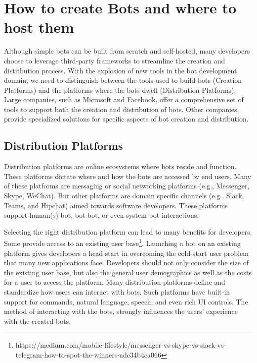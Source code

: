 \documentclass{sig-alternate}
\begin{document}
\section{How to create Bots and where to host them}

	Although simple bots can be built from scratch and self-hosted, many developers choose to leverage third-party frameworks to streamline the creation and distribution process. With the explosion of new tools in the bot development domain, we need to distinguish between the tools used to build bots (Creation Platforms) and the platforms where the bots dwell (Distribution Platforms).
%
	Large companies, such as Microsoft and Facebook, offer a comprehensive set of tools to support both the creation and distribution of bots. Other companies, provide specialized solutions for specific aspects of bot creation and distribution. 

	\subsection{Distribution Platforms}
	Distribution platforms are online ecosystems where bots reside and function. These platforms dictate where and how the bots are accessed by end users. Many of these platforms are messaging or social networking platforms (e.g., Messenger, Skype, WeChat).  But other platforms are domain specific channels (e.g., Slack, Teams, and Hipchat) aimed towards software developers.  
	These platforms support human(s)-bot, bot-bot, or even system-bot interactions.  

	Selecting the right distribution platform can lead to many benefits for developers.
	Some provide access to an existing user base\footnote{https://medium.com/mobile-lifestyle/messenger-vs-skype-vs-slack-vs-telegram-how-to-spot-the-winners-adc34b4ca066\label{How_to_spot_the_winners}}.
	Launching a bot on an existing platform gives developers a head start in overcoming the cold-start user problem that many new applications face. 
	Developers should not only consider the size of the existing user base, but also the general user demographics as well as the costs for a user to access the platform.   
	Many distribution platforms define and standardize how users can interact with bots.  Such platforms have built-in support for commands, natural language, speech, and even rich UI controls.  The method of interacting with the bots, strongly influences the users' experience with the created bots.
	
\end{document}
